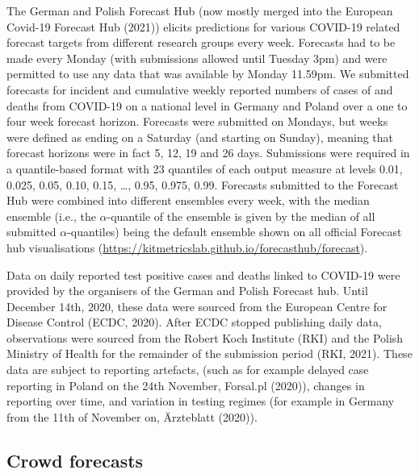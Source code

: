 \documentclass[
]{article}
\begin{document}
The German and Polish Forecast Hub (now mostly merged into the European Covid-19 Forecast Hub (2021)) elicits predictions for various COVID-19 related forecast targets from different research groups every week. Forecasts had to be made every Monday (with submissions allowed until Tuesday 3pm) and were permitted to use any data that was available by Monday 11.59pm. We submitted forecasts for incident and cumulative weekly reported numbers of cases of and deaths from COVID-19 on a national level in Germany and Poland over a one to four week forecast horizon. Forecasts were submitted on Mondays, but weeks were defined as ending on a Saturday (and starting on Sunday), meaning that forecast horizons were in fact 5, 12, 19 and 26 days. Submissions were required in a quantile-based format with 23 quantiles of each output measure at levels 0.01, 0.025, 0.05, 0.10, 0.15, \ldots, 0.95, 0.975, 0.99. Forecasts submitted to the Forecast Hub were combined into different ensembles every week, with the median ensemble (i.e., the \(\alpha\)-quantile of the ensemble is given by the median of all submitted \(\alpha\)-quantiles) being the default ensemble shown on all official Forecast hub visualisations (\url{https://kitmetricslab.github.io/forecasthub/forecast}).

Data on daily reported test positive cases and deaths linked to COVID-19 were provided by the organisers of the German and Polish Forecast hub. Until December 14th, 2020, these data were sourced from the European Centre for Disease Control (ECDC, 2020). After ECDC stopped publishing daily data, observations were sourced from the Robert Koch Institute (RKI) and the Polish Ministry of Health for the remainder of the submission period (RKI, 2021). These data are subject to reporting artefacts, (such as for example delayed case reporting in Poland on the 24th November, Forsal.pl (2020)), changes in reporting over time, and variation in testing regimes (for example in Germany from the 11th of November on, Ärzteblatt (2020)).

\hypertarget{crowd-forecasts}{%
\subsection{Crowd forecasts}\label{crowd-forecasts}}
\end{document}
